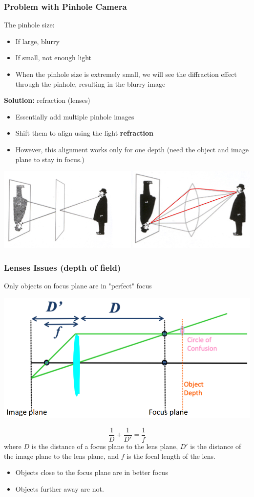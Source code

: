 \documentclass[10pt]{article}
\begin{document}
\subsubsection*{Problem with Pinhole Camera}
The pinhole size:
\begin{itemize}
	\item If large, blurry
	\item If small, not enough light
	\item When the pinhole size is extremely small, we will see the diffraction effect through the pinhole, resulting in the blurry image
\end{itemize}
\textbf{Solution:} refraction (lenses)
\begin{itemize}
	\item Essentially add multiple pinhole images
	\item Shift them to align using the light \textbf{refraction}
	\item However, this alignment works only for \underline{one depth} (need the object and image plane to stay in focus.)
\end{itemize}
\begin{center} 
	\includegraphics*[width=\textwidth]{L1_12.png} 
\end{center}

\pagebreak
\subsubsection*{Lenses Issues (depth of field)}
Only objects on focus plane are in "perfect" focus
\begin{center} 
	\includegraphics*[width=\textwidth]{L1_13.png} 
\end{center}
\[\frac{1}{D} + \frac{1}{D'} = \frac{1}{f}\]
where $D$ is the distance of a focus plane to the lens plane, $D'$ is the distance of the image plane to the lens plane, and $f$ is the focal length of the lens.
\begin{itemize}
	\item Objects close to the focus plane are in better focus
	\item Objects further away are not.
\end{itemize}
\end{document}
